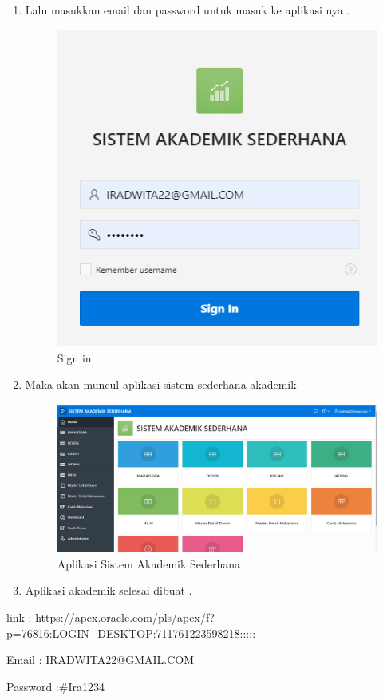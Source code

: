 \begin{enumerate}
\item Lalu masukkan email dan password untuk masuk ke aplikasi nya . 
\newline
\begin{figure}[!htbp]
    \centering
    \includegraphics[scale=0.7]{figures/41.png}
    \caption{Sign in}
    \label{fig:my_label}
\end{figure}
\newline
    \item  Maka akan muncul aplikasi sistem sederhana akademik 
\newline
\begin{figure}[!htbp]
    \centering
    \includegraphics[scale=0.3]{figures/42.png}
    \caption{Aplikasi Sistem Akademik Sederhana}
    \label{fig:my_label}
\end{figure}
\newline
    \item  Aplikasi akademik selesai dibuat .
\end{enumerate}

link : https://apex.oracle.com/pls/apex/f?p=76816:LOGIN_DESKTOP:711761223598218:::::

Email : IRADWITA22@GMAIL.COM

Password :#Ira1234






\begin{enumerate}


\end{enumerate}
